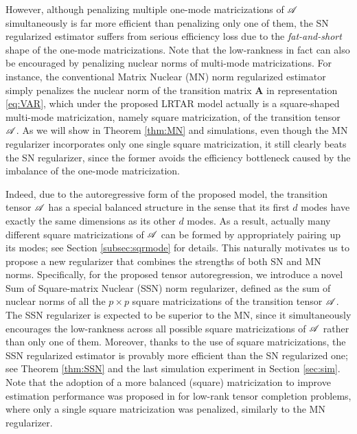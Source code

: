 \documentclass[12pt]{article}
\newcommand{\bm}{\boldsymbol}
\newcommand{\cm}[1]{\mbox{\boldmath$\mathscr{#1}$}}
\begin{document}
However, although penalizing multiple one-mode matricizations of $\cm{A}$ simultaneously is far more efficient than penalizing only one of them,  the SN regularized estimator suffers from serious efficiency loss due to the \textit{fat-and-short} shape of the one-mode matricizations.  Note that the low-rankness in fact can also be encouraged by penalizing nuclear norms of multi-mode matricizations. For instance, the conventional Matrix Nuclear (MN) norm regularized estimator \citep{negahban2011estimation} simply penalizes the nuclear norm of the transition matrix $\bm{A}$ in representation \eqref{eq:VAR}, which  under the proposed LRTAR model actually is a square-shaped multi-mode matricization, namely square matricization, of the transition tensor $\cm{A}$. As we will show in Theorem \ref{thm:MN} and simulations, even though the MN regularizer  incorporates only one single square matricization, it still clearly beats the SN regularizer, since the former avoids the efficiency bottleneck  caused by the imbalance of the one-mode matricization.

Indeed, due to the autoregressive form of the proposed model, the transition tensor $\cm{A}$ has a special balanced structure in the sense that its first $d$ modes have exactly the same dimensions as its other $d$ modes. As a result, actually many different square matricizations of $\cm{A}$ can   be formed by appropriately pairing up its modes; see Section \ref{subsec:sqrmode} for details. This naturally  motivates us to propose a new regularizer that combines the strengths of both SN and MN norms. Specifically, for the proposed tensor autoregression, we introduce a novel Sum of Square-matrix Nuclear (SSN) norm regularizer, defined as the sum of nuclear norms of all the $p\times p$ square matricizations of the transition tensor $\cm{A}$. The SSN regularizer is expected to be superior to the MN, since it simultaneously encourages the low-rankness across all possible square matricizations of $\cm{A}$ rather than only one of them. Moreover,  thanks to the use of square matricizations, the SSN regularized estimator is provably more efficient than the SN regularized one; see Theorem \ref{thm:SSN} and the last simulation experiment in Section \ref{sec:sim}. Note that the adoption of a more balanced (square) matricization to improve estimation performance was proposed in \cite{mu2014square} for low-rank tensor completion problems, where only a single square matricization was penalized, similarly to the MN regularizer. 
\end{document}
